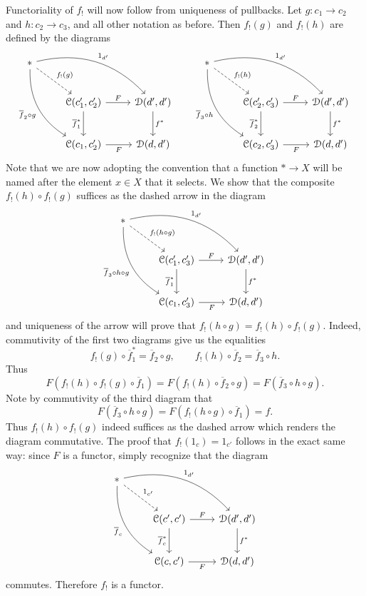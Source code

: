 Functoriality of $f_!$ will now follow from uniqueness of pullbacks. Let $g : c_1 \to c_2$ and $h : c_2 \to c_3$, and all other notation as before. Then $f_!(g)$ and $f_!(h)$ are defined by the diagrams
\[\begin{tikzcd}[row sep = 2.5em, column sep = 2.5em]
* \ar[" 1_{d'} ", bend left, drr] \ar[" \overline{f} _2 \circ g "', bend right, ddr] \ar[" f_!(g) ", dashed, dr]  &  &  & * \ar[" 1_{d'}  ", bend left, drr] \ar[" \overline{f} _{3} \circ h "', bend right, ddr] \ar[" f_!(h) ", dashed, dr]  &  &  \\
													       & \mathcal{C} (c_1',c_2')\ar[" F ", r] \ar[" \overline{f} _1^* "', d]  & \mathcal{D} (d',d')\ar[" f^* ", d]  & &  \mathcal{C} (c_2',c_3')\ar[" F ", r] \ar[" \overline{f} _2^* "', d]  & \mathcal{D} (d',d')\ar[" f^* ", d]   \\
 & \mathcal{C} (c_1,c_2')\ar[" F "', r]  & \mathcal{D}(d,d') &  & \mathcal{C} (c_2,c_3')\ar[" F "', r]  & \mathcal{D} (d,d')
\end{tikzcd}\]
Note that we are now adopting the convention that a function $*\to X$ will be named after the element $x\in X$ that it selects. We show that the composite $f_!(h)\circ f_!(g)$ suffices as the dashed arrow in the diagram
\[\begin{tikzcd}[row sep = 2.5em, column sep = 2.5em]
* \ar[" 1_{d'}  ", bend left, drr] \ar[" \overline{f} _3 \circ h\circ g "', bend right, ddr] \ar[" f_!(h\circ g) ", dashed, dr]  &  &  \\
 & \mathcal{C} (c'_1,c'_3)\ar[" F ", r] \ar[" \overline{f} _1^* "', d]  & \mathcal{D} (d',d')\ar[" f^* ", d]  \\
 & \mathcal{C} (c_1,c_3')\ar[" F "', r]  & \mathcal{D} (d,d')
\end{tikzcd}\]
and uniqueness of the arrow will prove that $f_!(h\circ g)=f_!(h)\circ f_!(g)$. Indeed, commutivity of the first two diagrams give us the equalities
\[
	f_!(g)\circ \overline{f} _1^*=\overline{f} _2\circ g,\qquad f_!(h)\circ \overline{f} _2=\overline{f} _3 \circ h
.\]
Thus
\[
	F(f_!(h)\circ f_!(g)\circ \overline{f} _1)=F(f_!(h)\circ \overline{f} _2\circ g)=F(\overline{f} _3 \circ h\circ g)
.\]
Note by commutivity of the third diagram that
\[
	F(\overline{f} _3 \circ h\circ g)=F(f_!(h\circ g)\circ \overline{f} _1)=f
.\]
Thus $f_!(h)\circ f_!(g)$ indeed suffices as the dashed arrow which renders the diagram commutative. The proof that $f_!(1_c)=1_{c'} $ follows in the exact same way: since $F$ is a functor, simply recognize that the diagram
\[\begin{tikzcd}[row sep = 2.5em, column sep = 2.5em]
* \ar[" 1_{d'}  ", bend left, drr] \ar[" \overline{f} _c "', bend right, ddr] \ar[" 1_{c'}  ", dashed, dr]  &  &  \\
 & \mathcal{C} (c',c')\ar[" F ", r] \ar[" \overline{f} _c^* "', d]  & \mathcal{D} (d',d')\ar[" f^* ", d]  \\
 & \mathcal{C} (c,c')\ar[" F "', r]  & \mathcal{D} (d,d')
\end{tikzcd}\]
commutes. Therefore $f_!$ is a functor.

